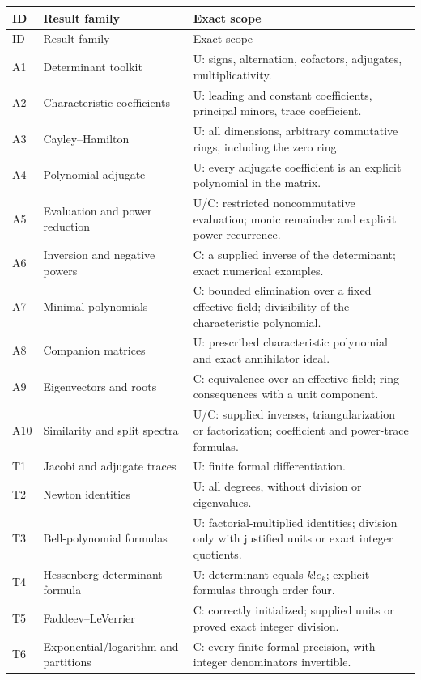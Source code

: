 \small
\begin{longtable}{@{}p{}p{}p{}@{}}
\toprule
ID & Result family & Exact scope \\
\midrule
\endfirsthead
\toprule ID & Result family & Exact scope \\ \midrule
\endhead
\bottomrule
\endfoot
A1 & Determinant toolkit & U: signs, alternation, cofactors, adjugates, multiplicativity. \\
A2 & Characteristic coefficients & U: leading and constant coefficients, principal minors, trace coefficient. \\
A3 & Cayley--Hamilton & U: all dimensions, arbitrary commutative rings, including the zero ring. \\
A4 & Polynomial adjugate & U: every adjugate coefficient is an explicit polynomial in the matrix. \\
A5 & Evaluation and power reduction & U/C: restricted noncommutative evaluation; monic remainder and explicit power recurrence. \\
A6 & Inversion and negative powers & C: a supplied inverse of the determinant; exact numerical examples. \\
A7 & Minimal polynomials & C: bounded elimination over a fixed effective field; divisibility of the characteristic polynomial. \\
A8 & Companion matrices & U: prescribed characteristic polynomial and exact annihilator ideal. \\
A9 & Eigenvectors and roots & C: equivalence over an effective field; ring consequences with a unit component. \\
A10 & Similarity and split spectra & U/C: supplied inverses, triangularization or factorization; coefficient and power-trace formulas. \\
T1 & Jacobi and adjugate traces & U: finite formal differentiation. \\
T2 & Newton identities & U: all degrees, without division or eigenvalues. \\
T3 & Bell-polynomial formulas & U: factorial-multiplied identities; division only with justified units or exact integer quotients. \\
T4 & Hessenberg determinant formula & U: determinant equals $k!e_k$; explicit formulas through order four. \\
T5 & Faddeev--LeVerrier & C: correctly initialized; supplied units or proved exact integer division. \\
T6 & Exponential/logarithm and partitions & C: every finite formal precision, with integer denominators invertible. \\

\end{longtable}
